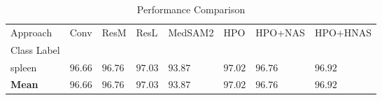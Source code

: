 \begin{table}
\caption{Performance Comparison}
\label{tab:results}
\begin{tabular}{llllllll}
\toprule
Approach & Conv & ResM & ResL & MedSAM2 & HPO & HPO+NAS & HPO+HNAS \\
Class Label &  &  &  &  &  &  &  \\
\midrule
spleen & $96.66$ & $96.76$ & $\mathbf{97.03}$ & $93.87$ & $97.02$ & $96.76$ & $96.92$ \\
\textbf{Mean} & $96.66$ & $96.76$ & $\mathbf{97.03}$ & $93.87$ & $97.02$ & $96.76$ & $96.92$ \\
\bottomrule
\end{tabular}
\end{table}
